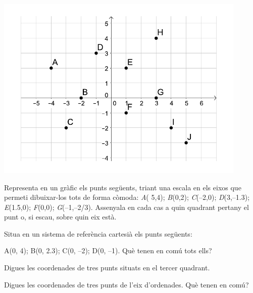 \begin{mylist}
\begin{minipage}[t]{0.5\textwidth}
\end{minipage}
\begin{minipage}{0.5\textwidth}
	\vspace{3cm}
 \includegraphics*[width=0.9\textwidth]{img-08/punts}
\end{minipage} 



\exer   Representa en un gràfic els punts següents, triant una escala en els eixos que permeti dibuixar-los tots de forma còmoda: \textit{A}( 5,4); \textit{B}(0,2); \textit{C}(--2,0); \textit{D}(3,--1.3); \textit{E}(1.5,0); \textit{F}(0,0); \textit{G}(--1,--2/3). Assenyala en cada cas a quin quadrant pertany el punt o, si escau, sobre quin eix està.

\vspace{2cm}
\exer  Situa en un sistema de referència cartesià els punts següents: 

A(0, 4); B(0, 2.3); C(0, --2); D(0, --1). Què tenen en comú tots ells?


\exer \mental Digues les coordenades de tres punts situats en el tercer quadrant.


\exer  \mental Digues les coordenades de tres punts de l'eix d'ordenades. Què tenen en comú? 


\end{mylist}




